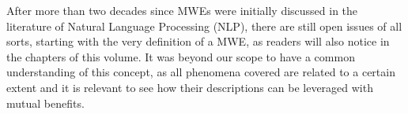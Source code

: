 \begin{refsection}
After more than two decades since MWEs were initially discussed in the literature of Natural Language Processing (NLP), there are still open issues of all sorts, starting with the very definition of a MWE, as readers will also notice in the chapters of this volume. It was beyond our scope to have a common understanding of this concept, as all phenomena covered are related to a certain extent and it is relevant to see how their descriptions can be leveraged with mutual benefits.


{\sloppy\printbibliography[heading=subbibliography]}
\end{refsection}

